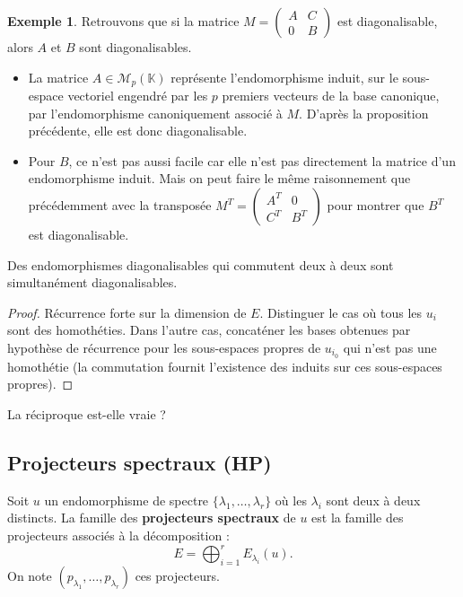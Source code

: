 \documentclass[french]{article}
\newcommand{\K}{\mathbb{K}}
\theoremstyle{plain}
\theoremstyle{definition}
\newtheorem*{ex}{Exemple}
\theoremstyle{remark}
\begin{document}
	\begin{ex}
		Retrouvons que si la matrice $M=\begin{pmatrix}
			A&C\\
			0&B
		\end{pmatrix}$ est diagonalisable, alors $A$ et $B$ sont diagonalisables.
		\begin{itemize}
			\item La matrice $A\in\mathcal{M}_p(\K)$ représente l'endomorphisme induit, sur le sous-espace vectoriel engendré par les $p$ premiers vecteurs de la base canonique, par l'endomorphisme canoniquement associé à $M$. D'après la proposition précédente, elle est donc diagonalisable.
			\item Pour $B$, ce n'est pas aussi facile car elle n'est pas directement la matrice d'un endomorphisme induit. Mais on peut faire le même raisonnement que précédemment avec la transposée $M^T=\begin{pmatrix}
				A^T&0\\
				C^T&B^T
			\end{pmatrix}$ pour montrer que $B^T$ est diagonalisable.
		\end{itemize}
	\end{ex}
	
	\begin{thm}%
		Des endomorphismes diagonalisables qui commutent deux à deux sont simultanément diagonalisables.
	\end{thm}
	\begin{proof}
		Récurrence forte sur la dimension de $E$. Distinguer le cas où tous les $u_i$ sont des homothéties. Dans l'autre cas, concaténer les bases obtenues par hypothèse de récurrence pour les sous-espaces propres de $u_{i_0}$ qui n'est pas une homothétie (la commutation fournit l'existence des induits sur ces sous-espaces propres).
	\end{proof}
	
	\begin{exo}
		La réciproque est-elle vraie ?
	\end{exo}
	
	\subsection{Projecteurs spectraux (HP)}
	
	\begin{dfn}
		Soit $u$ un endomorphisme de spectre $\{\lambda_1,\ldots,\lambda_r\}$ où les $\lambda_i$ sont deux à deux distincts. La famille des \textbf{projecteurs spectraux} de $u$ est la famille des projecteurs associés à la décomposition : $$E=\bigoplus_{i=1}^rE_{\lambda_i}(u).$$ On note $(p_{\lambda_1},\ldots,p_{\lambda_r})$ ces projecteurs.
	\end{dfn}
	
\end{document}
